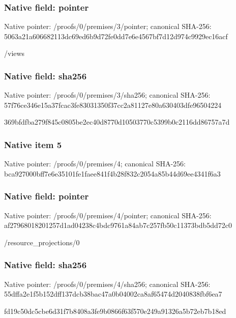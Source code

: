 \documentclass[10pt,a4paper]{article}
\begin{document}
\subsubsection{Native field: pointer}


Native pointer: /proofs/0/premises/3/pointer; canonical SHA-256: 5063a21a606682113dc69ed6\allowbreak{}b9d72fe0dd7e6e4567bf7d12\allowbreak{}d974c9929ec16acf


/views


\subsubsection{Native field: sha256}


Native pointer: /proofs/0/premises/3/sha256; canonical SHA-256: 57f76ce346e15a37fcac3fe8\allowbreak{}3031350f37cc2a81127e80a6\allowbreak{}30403dfe96504224


369bfdfba279f845c0805be2\allowbreak{}ec40d8770d10503770c5399b\allowbreak{}0c2116dd86757a7d


\subsubsection{Native item 5}


Native pointer: /proofs/0/premises/4; canonical SHA-256: bca927000bff7e6e35101fe1\allowbreak{}faee841f4b28f832c2054a85\allowbreak{}b44d69ee4341f6a3



\subsubsection{Native field: pointer}


Native pointer: /proofs/0/premises/4/pointer; canonical SHA-256: af27968018201257d1ad0423\allowbreak{}8c4bdc9761a84ab7c257fb50\allowbreak{}c11373bdb5dd72c0


/resource\_projections/0


\subsubsection{Native field: sha256}


Native pointer: /proofs/0/premises/4/sha256; canonical SHA-256: 55dffa2e1f5b152dff137dcb\allowbreak{}38bac47a0b04002ca8af6547\allowbreak{}4d2040838fbf6ea7


fd19c50dc5cbe6d31f7b8408\allowbreak{}a3fe9b0866f63f570e249a91\allowbreak{}326a5b72eb7b18ed
\end{document}
